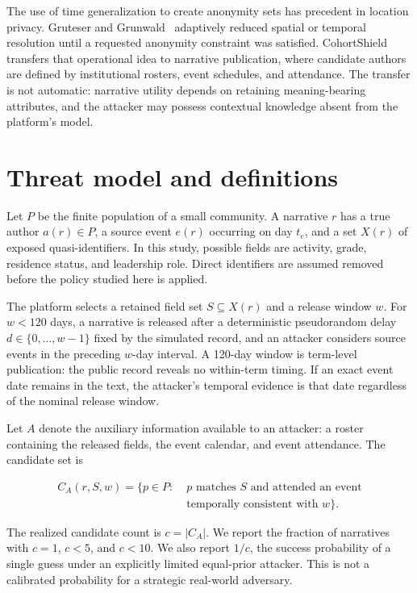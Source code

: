 \documentclass[pdflatex,sn-mathphys-num]{sn-jnl}
\theoremstyle{plain}
\begin{document}
The use of time generalization to create anonymity sets has precedent in location privacy. Gruteser and Grunwald~\cite{gruteser2003} adaptively reduced spatial or temporal resolution until a requested anonymity constraint was satisfied. CohortShield transfers that operational idea to narrative publication, where candidate authors are defined by institutional rosters, event schedules, and attendance. The transfer is not automatic: narrative utility depends on retaining meaning-bearing attributes, and the attacker may possess contextual knowledge absent from the platform's model.

\section{Threat model and definitions}\label{sec:threat}

Let $P$ be the finite population of a small community. A narrative $r$ has a true author $a(r)\in P$, a source event $e(r)$ occurring on day $t_e$, and a set $X(r)$ of exposed quasi-identifiers. In this study, possible fields are activity, grade, residence status, and leadership role. Direct identifiers are assumed removed before the policy studied here is applied.

The platform selects a retained field set $S\subseteq X(r)$ and a release window $w$. For $w<120$ days, a narrative is released after a deterministic pseudorandom delay $d\in\{0,\ldots,w-1\}$ fixed by the simulated record, and an attacker considers source events in the preceding $w$-day interval. A 120-day window is term-level publication: the public record reveals no within-term timing. If an exact event date remains in the text, the attacker's temporal evidence is that date regardless of the nominal release window.

Let $A$ denote the auxiliary information available to an attacker: a roster containing the released fields, the event calendar, and event attendance. The candidate set is

\begin{equation}
\begin{aligned}
C_A(r,S,w)=\{p\in P:\;&p\text{ matches }S\text{ and attended an event}\\
&\text{temporally consistent with }w\}.
\end{aligned}
\label{eq:candidates}
\end{equation}

The realized candidate count is $c=|C_A|$. We report the fraction of narratives with $c=1$, $c<5$, and $c<10$. We also report $1/c$, the success probability of a single guess under an explicitly limited equal-prior attacker. This is not a calibrated probability for a strategic real-world adversary.
\end{document}
